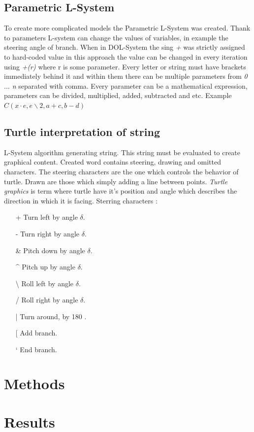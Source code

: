\documentclass[b5paper,twoside,11pt]{article}
\begin{document}
\subsection{Parametric L-System}
To create more complicated models the Parametric L-System was created. Thank to parameters L-system can change the values of variables, in example the steering angle of branch. When in DOL-System the sing \textit{+} was strictly assigned to hard-coded value in this approach the value can be changed in every iteration using \textit{+(r)} where r is some parameter. Every letter or string must have brackets immediately behind it and within them there can be multiple parameters from \textit{0 $\ldots$ n} separated with comma. Every parameter can be a mathematical expression, parameters can be divided, multiplied, added, subtracted and etc. Example $C(x\cdot e,e\backslash 2,a+c,b-d)$
\subsection{Turtle interpretation of string}
L-System algorithm generating string. This string must be evaluated to create graphical content. Created word contains steering, drawing and omitted characters. The steering characters are the one which controls the behavior of turtle. Drawn are those which simply adding a line between points.
\textit{Turtle graphics} is term where turtle have it's position and angle which describes the direction in which it is facing. 
Sterring characters :
  \begin{itemize}  %
\item[+] Turn  left  by  angle $\delta$.
\item[-] Turn right by angle  $\delta$.
\item[\&] Pitch down by angle  $\delta$.
\item[\string^]Pitch up by angle  $\delta$.
\item[\textbackslash] Roll left by angle  $\delta$.
\item[/]Roll right by angle  $\delta$.
\item[\string|] Turn around, by 180 .
\item[[] Add branch.
\item [\char`\]]  End branch.
\end{itemize}	
\section{Methods}

\section{Results}
\end{document}
